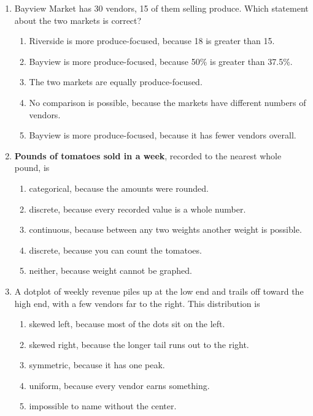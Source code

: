 \documentclass[12pt]{article}
\newcommand{\letterroom}{\rule[-15pt]{0pt}{36pt}}
\begin{document}
\begin{enumerate}[leftmargin=1.9em, itemsep=0.13in]
  \boxguard[9]
  \item Bayview Market has 30 vendors, 15 of them selling produce. Which statement about the
        two markets is correct?
        \begin{enumerate}[label=\textbf{(\Alph*)}, leftmargin=2.2em, itemsep=2pt]
          \item Riverside is more produce-focused, because 18 is greater than 15.
          \item Bayview is more produce-focused, because 50\% is greater than 37.5\%.
          \item The two markets are equally produce-focused.
          \item No comparison is possible, because the markets have different numbers of vendors.
          \item Bayview is more produce-focused, because it has fewer vendors overall.
                \hfill{}\letterroom
        \end{enumerate}

  \boxguard[9]
  \item \textbf{Pounds of tomatoes sold in a week}, recorded to the nearest whole pound, is
        \begin{enumerate}[label=\textbf{(\Alph*)}, leftmargin=2.2em, itemsep=2pt]
          \item categorical, because the amounts were rounded.
          \item discrete, because every recorded value is a whole number.
          \item continuous, because between any two weights another weight is possible.
          \item discrete, because you can count the tomatoes.
          \item neither, because weight cannot be graphed.
                \hfill{}\letterroom
        \end{enumerate}

  \boxguard[9]
  \item A dotplot of weekly revenue piles up at the low end and trails off toward the high end,
        with a few vendors far to the right. This distribution is
        \begin{enumerate}[label=\textbf{(\Alph*)}, leftmargin=2.2em, itemsep=2pt]
          \item skewed left, because most of the dots sit on the left.
          \item skewed right, because the longer tail runs out to the right.
          \item symmetric, because it has one peak.
          \item uniform, because every vendor earns something.
          \item impossible to name without the center.
                \hfill{}\letterroom
        \end{enumerate}


\end{enumerate}
\end{document}
